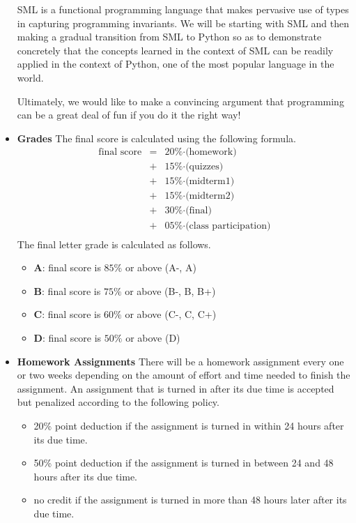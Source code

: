 \documentclass[11pt]{article}
\begin{document}
\begin{itemize}
SML is a functional programming language that makes pervasive use of
types in capturing programming invariants. We will be starting with
SML and then making a gradual transition from SML to Python so as to
demonstrate concretely that the concepts learned in the context of SML
can be readily applied in the context of Python, one of the most
popular language in the world.

Ultimately, we would like to make a convincing argument that programming
can be a great deal of fun if you do it the right way!

\item {\bf Grades}
The final score is calculated using the following formula.
\[\begin{array}{rcl}
\mbox{final score} & = & \mbox{20\%$\cdot$(homework)} \\
                   & + & \mbox{15\%$\cdot$(quizzes)} \\
                   & + & \mbox{15\%$\cdot$(midterm1)} \\
                   & + & \mbox{15\%$\cdot$(midterm2)} \\
                   & + & \mbox{30\%$\cdot$(final)} \\
                   & + & \mbox{05\%$\cdot$(class participation)} \\
\end{array}\]
The final letter grade is calculated as follows.
\begin{itemize}
\item{\bf A}: final score is $85\%$ or above (A-, A)
\item{\bf B}: final score is $75\%$ or above (B-, B, B+)
\item{\bf C}: final score is $60\%$ or above (C-, C, C+)
\item{\bf D}: final score is $50\%$ or above (D)
\end{itemize}

\item{\bf Homework Assignments}
There will be a homework assignment every one or two weeks depending on the
amount of effort and time needed to finish the assignment. An assignment that
is turned in after its due time is accepted but penalized according to the
following policy.
\begin{itemize}
\item 20\% point deduction if the assignment is turned in within 24 hours
after its due time.
\item 50\% point deduction if the assignment is turned in between 24 and 48 hours
after its due time.
\item no credit if the assignment is turned in more than 48 hours later after its due time.
\end{itemize}


\end{itemize}
\end{document}
